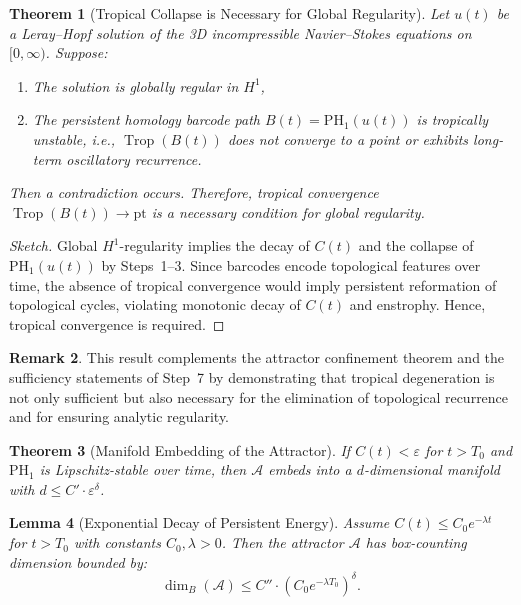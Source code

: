 \documentclass[11pt]{article}
\newtheorem{theorem}{Theorem}[section]
\newtheorem{lemma}[theorem]{Lemma}
\theoremstyle{definition}
\newtheorem{remark}[theorem]{Remark}
\begin{document}
\begin{theorem}[Tropical Collapse is Necessary for Global Regularity]
Let \( u(t) \) be a Leray--Hopf solution of the 3D incompressible Navier--Stokes equations on \( [0, \infty) \). Suppose:
\begin{enumerate}
    \item The solution is globally regular in \( H^1 \),
    \item The persistent homology barcode path \( B(t) = \mathrm{PH}_1(u(t)) \) is tropically unstable, i.e., \( \operatorname{Trop}(B(t)) \) does not converge to a point or exhibits long-term oscillatory recurrence.
\end{enumerate}
Then a contradiction occurs. Therefore, tropical convergence \( \operatorname{Trop}(B(t)) \to \text{pt} \) is a necessary condition for global regularity.
\end{theorem}

\begin{proof}[Sketch]
Global $H^1$-regularity implies the decay of $C(t)$ and the collapse of $\mathrm{PH}_1(u(t))$ by Steps~1--3. Since barcodes encode topological features over time, the absence of tropical convergence would imply persistent reformation of topological cycles, violating monotonic decay of $C(t)$ and enstrophy. Hence, tropical convergence is required.
\end{proof}

\begin{remark}
This result complements the attractor confinement theorem and the sufficiency statements of Step~7 by demonstrating that tropical degeneration is not only sufficient but also necessary for the elimination of topological recurrence and for ensuring analytic regularity.
\end{remark}

\begin{theorem}[Manifold Embedding of the Attractor]
If $C(t) < \varepsilon$ for $t > T_0$ and $\mathrm{PH}_1$ is Lipschitz-stable over time, then $\mathcal{A}$ embeds into a $d$-dimensional manifold with $d \le C' \cdot \varepsilon^\delta$.
\end{theorem}

\begin{lemma}[Exponential Decay of Persistent Energy]
\label{lem:exp-Ct}
Assume $C(t) \le C_0 e^{-\lambda t}$ for $t > T_0$ with constants $C_0, \lambda > 0$. Then the attractor $\mathcal{A}$ has box-counting dimension bounded by:
\[
\dim_B(\mathcal{A}) \le C'' \cdot (C_0 e^{-\lambda T_0})^\delta.
\]
\end{lemma}
\end{document}
